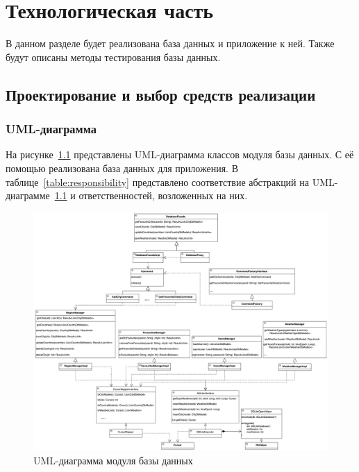 \chapter{Технологическая часть}
В данном разделе будет реализована база данных и приложение к ней.
Также будут описаны методы тестирования базы данных.

\section{Проектирование и выбор средств реализации}

\subsection{UML-диаграмма}
На рисунке~\ref{fig:db_uml} представлены UML-диаграмма классов модуля базы данных.
С её помощью реализована база данных для приложения.
В таблице~\ref{table:responsibility} представлено соответствие абстракций на UML-диаграмме~\ref{fig:db_uml} и ответственностей, возложенных на них.

\begin{figure}[H]
	\centering
	\includegraphics[width=\textwidth, height=0.65\textheight]{tools/img/db_uml.png}
	\caption{
        UML-диаграмма модуля базы данных
    }
	\label{fig:db_uml}
\end{figure}


